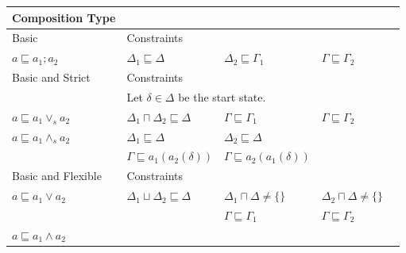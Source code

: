 \documentclass[12pt,journal,letterpaper,onecolumn]{IEEEtran}
\begin{document}
\begin{table}[h]
\begin{center}
\begin{minipage}{6in}
\footnotesize
\begin{center}
\begin{tabular}{|p{3.2cm}|llll|}
\hline
 Composition Type &             &&&\\
\hline \hline
Basic &   Constraints          &&&\\
\hline

$a \sqsubseteq a_1 ; a_2$ &

$\Delta_1 \sqsubseteq \Delta$ &

$\Delta_2 \sqsubseteq \Gamma_1$ &

$\Gamma \sqsubseteq \Gamma_2$ & \\
\hline \hline
 Basic and Strict & Constraints &&&\\
\hline &
\multicolumn{3}{l}{Let $\delta \in \Delta$ be the start state.} & \\


$a \sqsubseteq a_1 \vee_s a_2 $ &

$ \Delta_1 \sqcap \Delta_2 \sqsubseteq \Delta$ &

 $ \Gamma \sqsubseteq \Gamma_1$ &

$\Gamma \sqsubseteq \Gamma_2$ & \\



$a \sqsubseteq a_1 \wedge_s a_2$ &

$\Delta_1 \sqsubseteq \Delta$ & $\Delta_2 \sqsubseteq \Delta$ && \\

& $\Gamma  \sqsubseteq a_1(a_2(\delta))$ & $\Gamma \sqsubseteq a_2(a_1(\delta))$ && \\

\hline \hline
Basic and Flexible & Constraints &&& \\
\hline

$a \sqsubseteq a_1 \vee a_2 $ &

$ \Delta_1 \sqcup \Delta_2 \sqsubseteq \Delta$ &

$\Delta_1 \sqcap \Delta \neq \{ \} $ &

$\Delta_2 \sqcap \Delta \neq \{ \}$ &\\

& & $ \Gamma \sqsubseteq \Gamma_1 $& $ \Gamma
\sqsubseteq \Gamma_2$ & \\



$a \sqsubseteq a_1 \wedge a_2$ &


\end{tabular}
\end{center}
\end{minipage}
\end{center}
\end{table}
\end{document}
